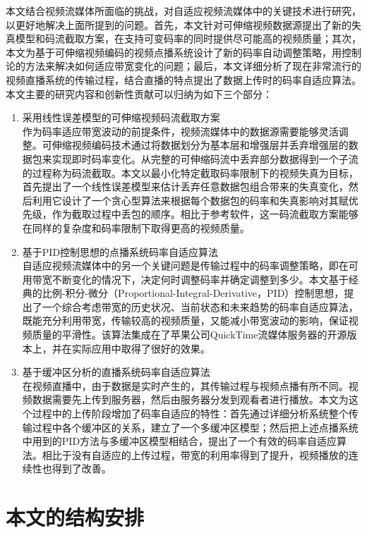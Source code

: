 本文结合视频流媒体所面临的挑战，对自适应视频流媒体中的关键技术进行研究，以更好地解决上面所提到的问题。首先，本文针对可伸缩视频数据源提出了新的失真模型和码流截取方案，在支持可变码率的同时提供尽可能高的视频质量；其次，本文为基于可伸缩视频编码的视频点播系统设计了新的码率自动调整策略，用控制论的方法来解决如何适应带宽变化的问题；最后，本文详细分析了现在非常流行的视频直播系统的传输过程，结合直播的特点提出了数据上传时的码率自适应算法。本文主要的研究内容和创新性贡献可以归纳为如下三个部分：
\begin{enumerate}
\item {采用线性误差模型的可伸缩视频码流截取方案}\\
作为码率适应带宽波动的前提条件，视频流媒体中的数据源需要能够灵活调整。可伸缩视频编码技术通过将数据划分为基本层和增强层并丢弃增强层的数据包来实现即时码率变化。从完整的可伸缩码流中丢弃部分数据得到一个子流的过程称为码流截取。本文以最小化特定截取码率限制下的视频失真为目标，首先提出了一个线性误差模型来估计丢弃任意数据包组合带来的失真变化，然后利用它设计了一个贪心型算法来根据每个数据包的码率和失真影响对其赋优先级，作为截取过程中丢包的顺序。相比于参考软件，这一码流截取方案能够在同样的复杂度和码率限制下取得更高的视频质量。
\item {基于PID控制思想的点播系统码率自适应算法}\\
自适应视频流媒体中的另一个关键问题是传输过程中的码率调整策略，即在可用带宽不断变化的情况下，决定何时调整码率并确定调整到多少。本文基于经典的比例-积分-微分（Proportional-Integral-Derivative，PID）控制思想，提出了一个综合考虑带宽的历史状况、当前状态和未来趋势的码率自适应算法，既能充分利用带宽，传输较高的视频质量，又能减小带宽波动的影响，保证视频质量的平滑性。该算法集成在了苹果公司QuickTime流媒体服务器的开源版本上，并在实际应用中取得了很好的效果。
\item {基于缓冲区分析的直播系统码率自适应算法}\\
在视频直播中，由于数据是实时产生的，其传输过程与视频点播有所不同。视频数据需要先上传到服务器，然后由服务器分发到观看者进行播放。本文为这个过程中的上传阶段增加了码率自适应的特性：首先通过详细分析系统整个传输过程中各个缓冲区的关系，建立了一个多缓冲区模型；然后把上述点播系统中用到的PID方法与多缓冲区模型相结合，提出了一个有效的码率自适应算法。相比于没有自适应的上传过程，带宽的利用率得到了提升，视频播放的连续性也得到了改善。
\end{enumerate}

\section{本文的结构安排}

